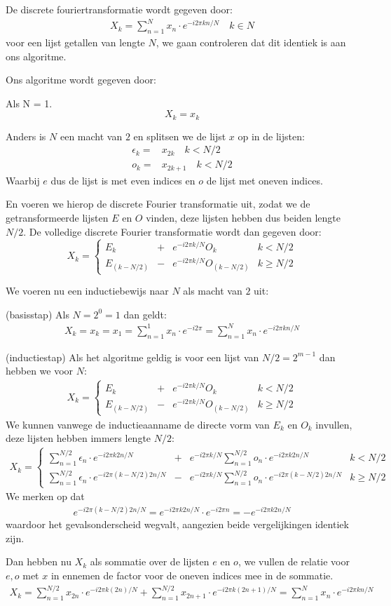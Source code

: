 \documentclass[11pt]{article}
\newcommand{\e}{\epsilon}
\newcommand{\eq}[1]{\begin{eqnarray*} #1 \end{eqnarray*}}
\begin{document}
De discrete fouriertransformatie wordt gegeven door:
\eq{
 X_k = \sum^N_{n=1} x_n \cdot e^{-i2\pi k n/N} \quad k\in N
}
voor een lijst getallen van lengte $N$, we gaan controleren dat 
dit identiek is aan ons algoritme.

Ons algoritme wordt gegeven door:

Als N = 1.
\[
  X_k = x_k
\]

Anders is $N$ een macht van $2$ en splitsen we de lijst $x$ op in de lijsten:
\eq{
  \e_k   =& x_{2k}  \quad k < N/2\\
  o_k =& x_{2k+1} \quad k < N/2
}
Waarbij $e$ dus de lijst is met even indices en $o$ de lijst met oneven indices.

En voeren we hierop de discrete Fourier transformatie uit, zodat we de getransformeerde lijsten
$E$ en $O$ vinden, deze lijsten hebben dus beiden lengte $N/2$.
De volledige discrete Fourier transformatie wordt dan gegeven door:
\[
  X_k = \left\{\begin{array}{llll}
    E_k         &+& e^{-i2\pi k/N} O_k &  k< N/2 \\
    E_{(k-N/2)} &-& e^{-i2\pi k/N} O_{(k-N/2)} &  k\geq N/2 
  \end{array}\right.
\]

We voeren nu een inductiebewijs naar $N$ als macht van $2$ uit:

(basisstap) Als $N=2^0=1$ dan geldt:
\eq{
  X_k = x_k = x_1 = \sum_{n=1}^{1} x_n \cdot e^{-i2\pi} = \sum_{n=1}^{N} x_n \cdot e^{-i2\pi k n /N}
}

(inductiestap) Als het algoritme geldig is voor een lijst van $N/2 = 2^{m-1}$ dan hebben we voor $N$:
\eq{
  X_k = \left\{\begin{array}{llll}
    E_k         &+& e^{-i2\pi k/N} O_k &  k< N/2 \\
    E_{(k-N/2)} &-& e^{-i2\pi k/N} O_{(k-N/2)} &  k\geq N/2 
  \end{array}\right.
}
We kunnen vanwege de inductieaanname de directe vorm van $E_k$ en $O_k$ invullen, deze lijsten
hebben immers lengte $N/2$:
\eq{
  X_k = \left\{\begin{array}{llll}
    \sum^{N/2}_{n=1} \e_n \cdot e^{-i2\pi k 2n/N} &+& 
    e^{-i2\pi k/N} 
    \sum^{N/2}_{n=1} o_n \cdot e^{-i2\pi k 2n/N} &  k< N/2 \\
    \sum^{N/2}_{n=1} \e_n \cdot e^{-i2\pi (k-N/2) 2n/N} &-& 
    e^{-i2\pi k/N} 
    \sum^{N/2}_{n=1} o_n \cdot e^{-i2\pi (k-N/2) 2n/N} &  k\geq N/2 
  \end{array}\right.
}
We merken op dat 
\eq{
  e^{-i2\pi(k-N/2)2n/N} = e^{-i2\pi k 2n/N}\cdot e^{-i2\pi n} = - e^{-i2\pi k 2n/N}
} 
waardoor het gevalsonderscheid wegvalt, aangezien beide vergelijkingen identiek zijn.

Dan hebben nu $X_k$ als sommatie over de lijsten $e$ en $o$, we vullen de relatie voor $e,o$ met $x$ in ennemen de factor voor de oneven indices mee in de sommatie.
\eq{
  X_k = \sum^{N/2}_{n=1} x_{2n} \cdot e^{-i2\pi k (2n)/N} + 
    \sum^{N/2}_{n=1} x_{2n+1} \cdot e^{-i2\pi k (2n+1)/N} 
    = \sum^N_{n=1} x_n \cdot e^{-i2\pi k n/N}
}
\end{document}
